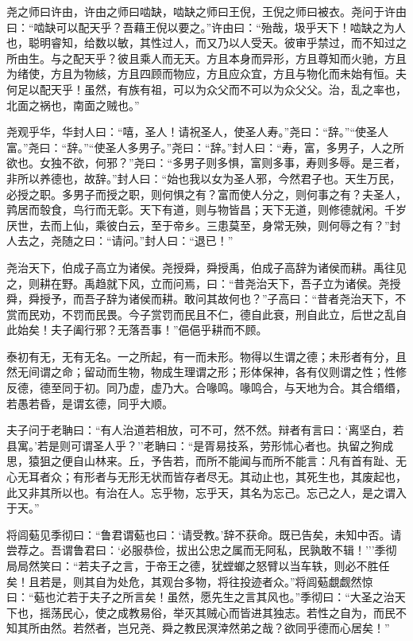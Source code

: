 \documentclass[]{article}
\begin{document}
尧之师曰许由，许由之师曰啮缺，啮缺之师曰王倪，王倪之师曰被衣。尧问于许由曰：``啮缺可以配天乎？吾藉王倪以要之。''许由曰：``殆哉，圾乎天下！啮缺之为人也，聪明睿知，给数以敏，其性过人，而又乃以人受天。彼审乎禁过，而不知过之所由生。与之配天乎？彼且乘人而无天。方且本身而异形，方且尊知而火驰，方且为绪使，方且为物絯，方且四顾而物应，方且应众宜，方且与物化而未始有恒。夫何足以配天乎！虽然，有族有祖，可以为众父而不可以为众父父。治，乱之率也，北面之祸也，南面之贼也。''

尧观乎华，华封人曰：``嘻，圣人！请祝圣人，使圣人寿。''尧曰：``辞。''``使圣人富。''尧曰：``辞。''``使圣人多男子。''尧曰：``辞。''封人曰：``寿，富，多男子，人之所欲也。女独不欲，何邪？''尧曰：``多男子则多惧，富则多事，寿则多辱。是三者，非所以养德也，故辞。''封人曰：``始也我以女为圣人邪，今然君子也。天生万民，必授之职。多男子而授之职，则何惧之有？富而使人分之，则何事之有？夫圣人，鹑居而彀食，鸟行而无彰。天下有道，则与物皆昌；天下无道，则修德就闲。千岁厌世，去而上仙，乘彼白云，至于帝乡。三患莫至，身常无殃，则何辱之有？''封人去之，尧随之曰：``请问。''封人曰：``退已！''

尧治天下，伯成子高立为诸侯。尧授舜，舜授禹，伯成子高辞为诸侯而耕。禹往见之，则耕在野。禹趋就下风，立而问焉，曰：``昔尧治天下，吾子立为诸侯。尧授舜，舜授予，而吾子辞为诸侯而耕。敢问其故何也？''子高曰：``昔者尧治天下，不赏而民劝，不罚而民畏。今子赏罚而民且不仁，德自此衰，刑自此立，后世之乱自此始矣！夫子阖行邪？无落吾事！''俋俋乎耕而不顾。

泰初有无，无有无名。一之所起，有一而未形。物得以生谓之德；未形者有分，且然无间谓之命；留动而生物，物成生理谓之形；形体保神，各有仪则谓之性；性修反德，德至同于初。同乃虚，虚乃大。合喙鸣。喙鸣合，与天地为合。其合缗缗，若愚若昏，是谓玄德，同乎大顺。

夫子问于老聃曰：``有人治道若相放，可不可，然不然。辩者有言曰：`离坚白，若县寓。'若是则可谓圣人乎？''老聃曰：``是胥易技系，劳形怵心者也。执留之狗成思，猿狙之便自山林来。丘，予告若，而所不能闻与而所不能言：凡有首有趾、无心无耳者众；有形者与无形无状而皆存者尽无。其动止也，其死生也，其废起也，此又非其所以也。有治在人。忘乎物，忘乎天，其名为忘己。忘己之人，是之谓入于天。''

将闾葂见季彻曰：``鲁君谓葂也曰：`请受教。'辞不获命。既已告矣，未知中否。请尝荐之。吾谓鲁君曰：`必服恭俭，拔出公忠之属而无阿私，民孰敢不辑！'''季彻局局然笑曰：``若夫子之言，于帝王之德，犹螳螂之怒臂以当车轶，则必不胜任矣！且若是，则其自为处危，其观台多物，将往投迹者众。''将闾葂覷觑然惊曰：``葂也汒若于夫子之所言矣！虽然，愿先生之言其风也。''季彻曰：``大圣之治天下也，摇荡民心，使之成教易俗，举灭其贼心而皆进其独志。若性之自为，而民不知其所由然。若然者，岂兄尧、舜之教民溟涬然弟之哉？欲同乎德而心居矣！''
\end{document}
